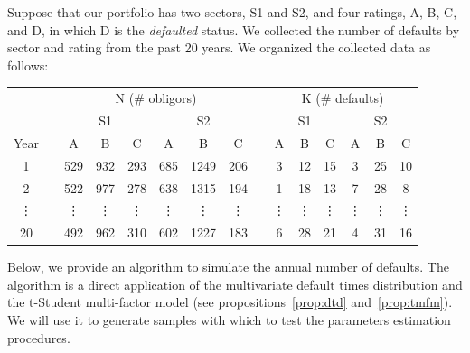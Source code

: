 \documentclass[11pt,fleqn]{book} %
\begin{document}
\begin{example}
	Suppose that our portfolio has two sectors, S1 and S2, and four ratings, 
	A, B, C, and D, in which D is the \emph{defaulted} status. We collected 
	the number of defaults by sector and rating from the past 20 years. We 
	organized the collected data as follows:

	\centering
	\begin{tabular}{cc|c|c|c||c|c|c|  c  |c|c|c||c|c|c|}
		\cline{3-8} \cline{10-15}
		& & \multicolumn{6}{|c|}{N (\# obligors)} & & \multicolumn{6}{|c|}{K (\# defaults)} \\
		\cline{3-8} \cline{10-15}
		& & \multicolumn{3}{|c||}{S1} & \multicolumn{3}{|c|}{S2} & & \multicolumn{3}{|c||}{S1} & \multicolumn{3}{|c|}{S2} \\
		\cline{1-1} \cline{3-8} \cline{10-15}
		\multicolumn{1}{|c|}{Year} & & A & B & C & A & B & C & & A & B & C & A & B & C \\
		\cline{1-1} \cline{3-8} \cline{10-15}
		\multicolumn{1}{|c|}{1} & & 529 & 932 & 293 & 685 & 1249 & 206 & & 3 & 12 & 15 & 3 & 25 & 10 \\
		\cline{1-1} \cline{3-8} \cline{10-15}
		\multicolumn{1}{|c|}{2} & & 522 & 977 & 278 & 638 & 1315 & 194 & & 1 & 18 & 13 & 7 & 28 & 8 \\
		\cline{1-1} \cline{3-8} \cline{10-15}
		\multicolumn{1}{|c|}{\vdots} & & \vdots & \vdots & \vdots & \vdots & \vdots & \vdots & & \vdots & \vdots & \vdots & \vdots & \vdots & \vdots \\
		\cline{1-1} \cline{3-8} \cline{10-15}
		\multicolumn{1}{|c|}{20} & & 492 & 962 & 310 & 602 & 1227 & 183 & & 6 & 28 & 21 & 4 & 31 & 16 \\
		\cline{1-1} \cline{3-8} \cline{10-15}
	\end{tabular}
\end{example}

Below, we provide an algorithm to simulate the annual number of defaults. The 
algorithm is a direct application of the multivariate default times distribution
and the t-Student multi-factor model (see propositions~\ref{prop:dtd} 
and~\ref{prop:tmfm}). We will use it to generate samples with which to 
test the parameters estimation procedures. 
\end{document}
